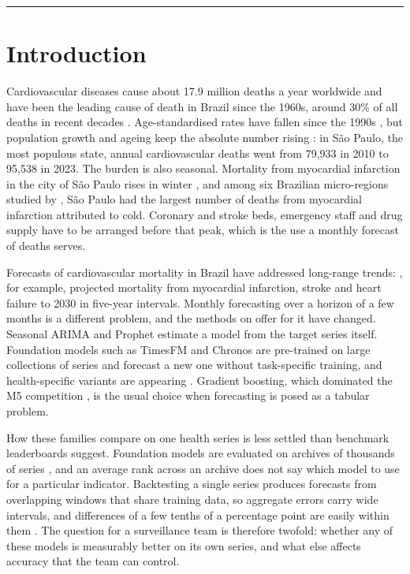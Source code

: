 \vspace{1em}
\hrule

\section{Introduction}

Cardiovascular diseases cause about 17.9 million deaths a year worldwide \citep{roth2020}
and have been the leading cause of death in Brazil since the 1960s, around 30\% of all
deaths in recent decades \citep{oliveira2020, brant2017}. Age-standardised rates have fallen
since the 1990s \citep{ribeiro2016}, but population growth and ageing keep the absolute
number rising \citep{brant2025}: in S\~ao Paulo, the most populous state, annual
cardiovascular deaths went from 79{,}933 in 2010 to 95{,}538 in 2023. The burden is also
seasonal. Mortality from myocardial infarction in the city of S\~ao Paulo rises in winter
\citep{sharovsky2002}, and among six Brazilian micro-regions studied by \citet{ferreira2019},
S\~ao Paulo had the largest number of deaths from myocardial infarction attributed to cold. Coronary and stroke beds, emergency staff
and drug supply have to be arranged before that peak, which is the use a monthly forecast
of deaths serves. 

Forecasts of cardiovascular mortality in Brazil have addressed long-range trends:
\citet{siqueira2020}, for example, projected mortality from myocardial
infarction, stroke and heart failure to 2030 in five-year intervals. Monthly forecasting
over a horizon of a few months is a different problem, and the methods on offer for it have
changed. Seasonal ARIMA \citep{box2015} and Prophet \citep{taylor2018} estimate a model from
the target series itself. Foundation models such as TimesFM \citep{das2024} and Chronos
\citep{ansari2024} are pre-trained on large collections of series and forecast a new one
without task-specific training, and health-specific variants are appearing \citep{li2025}.
Gradient boosting, which dominated the M5 competition \citep{makridakis2022}, is the usual choice
when forecasting is posed as a tabular problem.

How these families compare on one health series is less settled than benchmark leaderboards
suggest. Foundation models are evaluated on archives of thousands of series
\citep{godahewa2021, aksu2024}, and an average rank across an archive does not say which
model to use for a particular indicator. Backtesting a single series produces forecasts from
overlapping windows that share training data, so aggregate errors carry wide intervals, and
differences of a few tenths of a percentage point are easily within them
\citep{hewamalage2023}. The question for a surveillance team is therefore twofold: whether
any of these models is measurably better on its own series, and what else affects accuracy
that the team can control.


